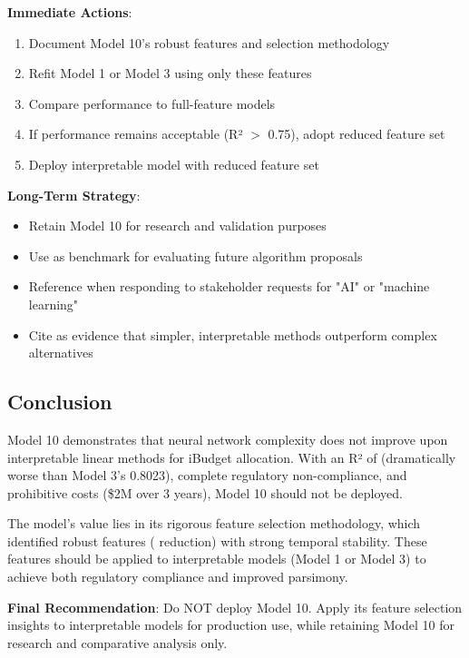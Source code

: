 \textbf{Immediate Actions}:
\begin{enumerate}
    \item Document Model 10's \ModelTenRobustFeatures{} robust features and selection methodology
    \item Refit Model 1 or Model 3 using only these \ModelTenRobustFeatures{} features
    \item Compare performance to full-feature models
    \item If performance remains acceptable (R² $>$ 0.75), adopt reduced feature set
    \item Deploy interpretable model with reduced feature set
\end{enumerate}

\textbf{Long-Term Strategy}:
\begin{itemize}
    \item Retain Model 10 for research and validation purposes
    \item Use as benchmark for evaluating future algorithm proposals
    \item Reference when responding to stakeholder requests for "AI" or "machine learning"
    \item Cite as evidence that simpler, interpretable methods outperform complex alternatives
\end{itemize}

\subsection{Conclusion}

Model 10 demonstrates that neural network complexity does not improve upon interpretable linear methods for iBudget allocation. With an R² of \ModelTenRSquaredTest{} (dramatically worse than Model 3's 0.8023), complete regulatory non-compliance, and prohibitive costs (\$2M over 3 years), Model 10 should not be deployed.

The model's value lies in its rigorous feature selection methodology, which identified \ModelTenRobustFeatures{} robust features (\ModelTenFeatureReduction{} reduction) with strong temporal stability. These features should be applied to interpretable models (Model 1 or Model 3) to achieve both regulatory compliance and improved parsimony.

\textbf{Final Recommendation}: Do NOT deploy Model 10. Apply its feature selection insights to interpretable models for production use, while retaining Model 10 for research and comparative analysis only.